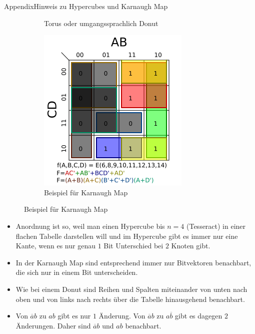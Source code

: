 \begin{frame}[allowframebreaks]{Appendix}{Hinweis zu Hypercubes und Karnaugh Map}
\begin{figure}
\begin{subfigure}{0.4\textwidth}
       \caption{Torus oder umgangssprachlich Donut}
    \end{subfigure}
    \begin{subfigure}{0.4\textwidth}
       \includegraphics[height=0.4\textheight, center]{./figures/K_map.png}
       \caption{Beispiel für Karnaugh Map}
    \end{subfigure}
  \end{figure}
  \begin{itemize}
      \item Anordnung ist so, weil man einen Hypercube bis $n=4$ (Tesseract) in einer flachen Tabelle darstellen will und im Hypercube gibt es immer nur eine Kante, wenn es nur genau $1$ Bit Unterschied bei $2$ Knoten gibt.
      \item In der Karnaugh Map sind entsprechend immer nur Bitvektoren benachbart, die sich nur in einem Bit unterscheiden. 
      \item Wie bei einem Donut sind Reihen und Spalten miteinander von unten nach oben und von links nach rechts über die Tabelle hinausgehend benachbart.
      \item Von $\overline{a}b$ zu $ab$ gibt es nur $1$ Änderung. Von $\overline{a}b$ zu $a\overline{b}$ gibt es dagegen $2$ Änderungen. Daher sind $\overline{a}b$ und $ab$ benachbart.
  \end{itemize} 
\end{frame}
 


